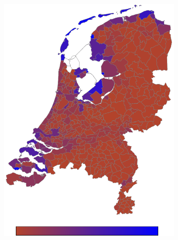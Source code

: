 \documentclass[a4paper,twoside,11pt]{article}
\begin{document}
\begin{figure}[h]
\begin{subfigure}[b]{0.12\textwidth}
                \includegraphics[width=\textwidth]{Heatmaps/HeatMap2.png}
                \caption{}
                \label{fig:LandWater}
        \end{subfigure}
        \begin{subfigure}[b]{0.12\textwidth}

\end{subfigure}
\end{figure}
\end{document}
